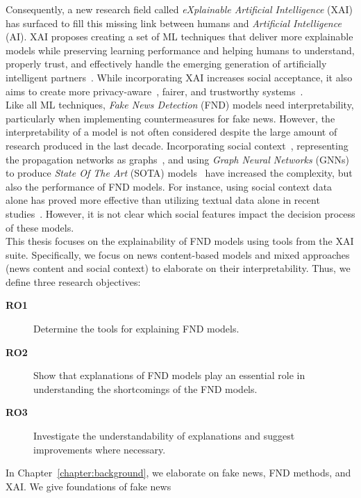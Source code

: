Consequently, a new research field called \emph{eXplainable Artificial Intelligence} (XAI) has surfaced to fill this missing link between humans and \emph{Artificial Intelligence} (AI). XAI proposes creating a set of ML techniques that deliver more explainable models while preserving learning performance and helping humans to understand, properly trust, and effectively handle the emerging generation of artificially intelligent partners~\parencite{XAI_Gunning}. While incorporating XAI increases social acceptance, it also aims to create more privacy-aware~\parencite{SlaveToTheAlgorithm_EdwardsVeale}, fairer, and trustworthy systems~\parencite{TheMythosOfModelInterpretability_Lipton}.\\
Like all ML techniques, \emph{Fake News Detection} (FND) models need interpretability, particularly when implementing countermeasures for fake news. However, the interpretability of a model is not often considered despite the large amount of research produced in the last decade. Incorporating social context~\parencite{FakeNewsNet_Shu}, representing the propagation networks as graphs~\parencite{UPFD_Dataset_Shu}, and using \emph{Graph Neural Networks} (GNNs) to produce \emph{State Of The Art} (SOTA) models~\parencite{FakeNewsDetectionUsingGeometricDeepLearning_Monti} have increased the complexity, but also the performance of FND models. For instance, using social context data alone has proved more effective than utilizing textual data alone in recent studies~\parencite{UPFD_Dataset_Shu}. However, it is not clear which social features impact the decision process of these models.\\
This thesis focuses on the explainability of FND models using tools from the XAI suite. Specifically, we focus on news content-based models and mixed approaches (news content and social context) to elaborate on their interpretability. Thus, we define three research objectives:
\begin{description}
    \item[\textbf{RO1}] Determine the tools for explaining FND models.
    \item[\textbf{RO2}] Show that explanations of FND models play an essential role in understanding the shortcomings of the FND models.
    \item[\textbf{RO3}] Investigate the understandability of explanations and suggest improvements where necessary.
\end{description}
In Chapter~\ref{chapter:background}, we elaborate on fake news, FND methods, and XAI. We give foundations of fake news
